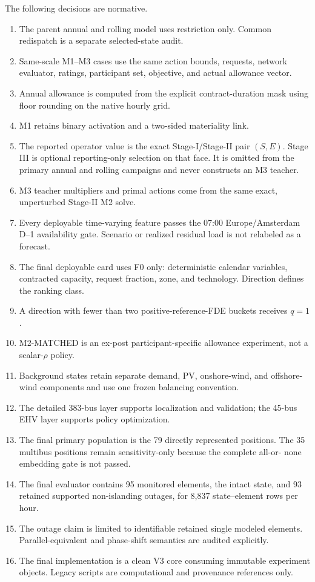 \documentclass[10pt,journal,onecolumn]{IEEEtran}
\begin{document}
The following decisions are normative.
\begin{enumerate}[leftmargin=*,itemsep=2pt]
\item The parent annual and rolling model uses restriction only. Common
redispatch is a separate selected-state audit.
\item Same-scale M1--M3 cases use the same action bounds, requests, network
evaluator, ratings, participant set, objective, and actual allowance vector.
\item Annual allowance is computed from the explicit contract-duration mask
using floor rounding on the native hourly grid.
\item M1 retains binary activation and a two-sided materiality link.
\item The reported operator value is the exact Stage-I/Stage-II pair $(S,E)$.
Stage III is optional reporting-only selection on that face. It is omitted from
the primary annual and rolling campaigns and never constructs an M3 teacher.
\item M3 teacher multipliers and primal actions come from the same exact,
unperturbed Stage-II M2 solve.
\item Every deployable time-varying feature passes the 07:00
Europe/Amsterdam D--1 availability gate. Scenario or realized residual load is
not relabeled as a forecast.
\item The final deployable card uses F0 only: deterministic calendar variables,
contracted capacity, request fraction, zone, and technology. Direction defines
the ranking class.
\item A direction with fewer than two positive-reference-FDE buckets receives
$q=1$.
\item M2-MATCHED is an ex-post participant-specific allowance experiment, not a
scalar-$\rho$ policy.
\item Background states retain separate demand, PV, onshore-wind, and offshore-
wind components and use one frozen balancing convention.
\item The detailed 383-bus layer supports localization and validation; the
45-bus EHV layer supports policy optimization.
\item The final primary population is the 79 directly represented positions.
The 35 multibus positions remain sensitivity-only because the complete all-or-
none embedding gate is not passed.
\item The final evaluator contains 95 monitored elements, the intact state, and
93 retained supported non-islanding outages, for 8,837 state--element rows per
hour.
\item The outage claim is limited to identifiable retained single modeled
elements. Parallel-equivalent and phase-shift semantics are audited explicitly.
\item The final implementation is a clean V3 core consuming immutable experiment
objects. Legacy scripts are computational and provenance references only.
\end{enumerate}
\end{document}
